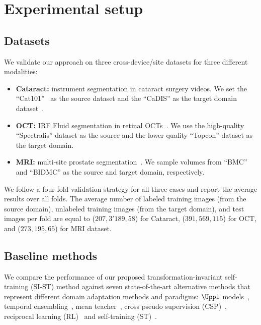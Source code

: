 \section{Experimental setup}
\label{sec:tist_experimental_settings}

\subsection{Datasets}
We validate our approach on three cross-device/site datasets for three different modalities: 

\begin{itemize}
    \item \textbf{Cataract:} instrument segmentation in cataract surgery videos. We set the ``Cat101''~ as the source dataset and the ``CaDIS'' as the target domain dataset~. 
    \item \textbf{OCT: }IRF Fluid segmentation in retinal OCTs~. We use the high-quality ``Spectralis'' dataset as the source and the lower-quality ``Topcon'' dataset as the target domain.
    \item \textbf{MRI:} multi-site prostate segmentation~. We sample volumes from ``BMC'' and ``BIDMC'' as the source and target domain, respectively.
\end{itemize} 

We follow a four-fold validation strategy for all three cases and report the average results over all folds. The average number of labeled training images (from the source domain), unlabeled training images (from the target domain), and test images per fold are equal to ($207, 3'189,58$) for Cataract, ($391,569,115$) for OCT, and ($273,195,65$) for MRI dataset.

\subsection{Baseline methods}
We compare the performance of our proposed transformation-invariant self-training (SI-ST) method against seven state-of-the-art alternative methods that represent different domain adaptation methods and paradigms: $\Uppi$ models~, temporal ensembling~, mean teacher~, cross pseudo supervision (CSP)~, reciprocal learning (RL)~ and self-training (ST)~.


